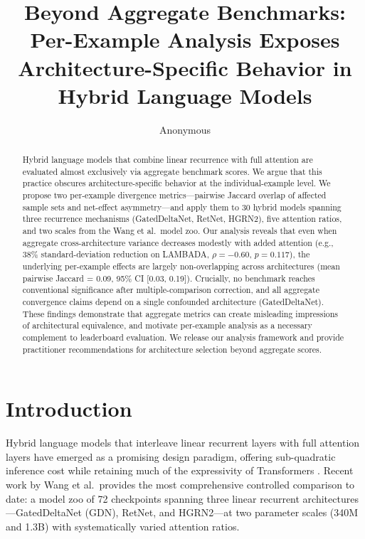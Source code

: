 \documentclass[11pt,a4paper]{article}
\title{Beyond Aggregate Benchmarks: Per-Example Analysis Exposes\\Architecture-Specific Behavior in Hybrid Language Models}
\author{Anonymous}
\date{}
\begin{document}
\maketitle

\begin{abstract}
Hybrid language models that combine linear recurrence with full attention are evaluated almost exclusively via aggregate benchmark scores.
We argue that this practice obscures architecture-specific behavior at the individual-example level.
We propose two per-example divergence metrics---pairwise Jaccard overlap of affected sample sets and net-effect asymmetry---and apply them to 30 hybrid models spanning three recurrence mechanisms (GatedDeltaNet, RetNet, HGRN2), five attention ratios, and two scales from the Wang et al.\ model zoo.
Our analysis reveals that even when aggregate cross-architecture variance decreases modestly with added attention (e.g., 38\% standard-deviation reduction on LAMBADA, $\rho=-0.60$, $p=0.117$), the underlying per-example effects are largely non-overlapping across architectures (mean pairwise Jaccard = 0.09, 95\% CI [0.03, 0.19]).
Crucially, no benchmark reaches conventional significance after multiple-comparison correction, and all aggregate convergence claims depend on a single confounded architecture (GatedDeltaNet).
These findings demonstrate that aggregate metrics can create misleading impressions of architectural equivalence, and motivate per-example analysis as a necessary complement to leaderboard evaluation.
We release our analysis framework and provide practitioner recommendations for architecture selection beyond aggregate scores.
\end{abstract}

\section{Introduction}
\label{sec:intro}

Hybrid language models that interleave linear recurrent layers with full attention layers have emerged as a promising design paradigm, offering sub-quadratic inference cost while retaining much of the expressivity of Transformers \cite{dao2024transformers,gu2024mamba}.
Recent work by Wang et al.\ provides the most comprehensive controlled comparison to date: a model zoo of 72 checkpoints spanning three linear recurrent architectures---GatedDeltaNet (GDN), RetNet, and HGRN2---at two parameter scales (340M and 1.3B) with systematically varied attention ratios.
\end{document}
